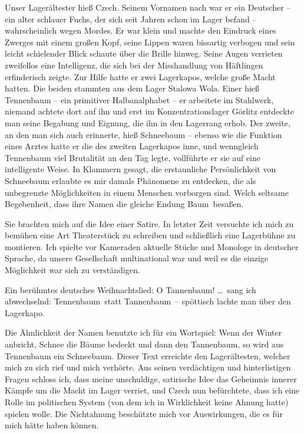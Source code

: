 Unser Lagerältester hieß Czech. Seinem Vornamen nach war er ein Deutscher -- ein alter schlauer Fuchs, der sich seit Jahren schon im Lager befand -- wahrscheinlich wegen Mordes. Er war klein und machte den Eindruck eines Zwerges mit einem großen Kopf, seine Lippen waren bissartig verbogen und sein leicht schielender Blick schaute über die Brille hinweg. Seine Augen verrieten zweifellos eine Intelligenz, die sich bei der Misshandlung von Häftlingen erfinderisch zeigte. Zur Hilfe hatte er zwei Lagerkapos, welche große Macht hatten. Die beiden stammten aus dem Lager Stalowa Wola. Einer hieß Tennenbaum -- ein primitiver Halbanalphabet -- er arbeitete im Stahlwerk, niemand achtete dort auf ihn und erst im Konzentrationslager Görlitz entdeckte man seine Begabung und Eignung, die ihn in den Lagerrang erhob. Der zweite, an den man sich auch erinnerte, hieß Schneebaum -- ebenso wie die Funktion eines Arztes hatte er die des zweiten Lagerkapos inne, und wenngleich Tennenbaum viel Brutalität an den Tag legte, vollführte er sie auf eine intelligente Weise. In Klammern gesagt, die erstaunliche Persönlichkeit von Schneebaum erlaubte es mir damals Phänomene zu entdecken, die als unbegrenzte Möglichkeiten in einem Menschen vorborgen sind. Welch seltsame Begebenheit, dass ihre Namen die gleiche Endung \glqq Baum\grqq~besaßen.

Sie brachten mich auf die Idee einer Satire. In letzter Zeit versuchte ich mich zu bemühen eine Art Theaterstück zu schreiben und schließlich eine Lagerbühne zu montieren. Ich spielte vor Kameraden aktuelle Stücke und Monologe in deutscher Sprache, da unsere Gesellschaft multinational war und weil es die einzige Möglichkeit war sich zu verständigen.

Ein berühmtes deutsches Weihnachtslied: \glqq O Tannenbaum! \dots\grqq~sang ich abwechselnd: \glqq Tennenbaum\grqq~statt \glqq Tannenbaum\grqq~-- spöttisch lachte man über den Lagerkapo.

Die Ähnlichkeit der Namen benutzte ich für ein Wortspiel: Wenn der Winter anbricht, Schnee die Bäume bedeckt und dann den Tannenbaum, so wird aus Tennenbaum ein Schneebaum. Dieser Text erreichte den Lagerältesten, welcher mich zu sich rief und mich verhörte. Aus seinen verdächtigen und hinterlistigen Fragen schloss ich, dass meine unschuldige, satirische Idee das Geheimnis innerer Kämpfe um die Macht im Lager verriet, und Czech nun befürchtete, dass ich eine Rolle im politischen System (von dem ich in Wirklichkeit keine Ahnung hatte) spielen wolle. Die Nichtahnung beschützte mich vor Auswirkungen, die es für mich hätte  haben können.

